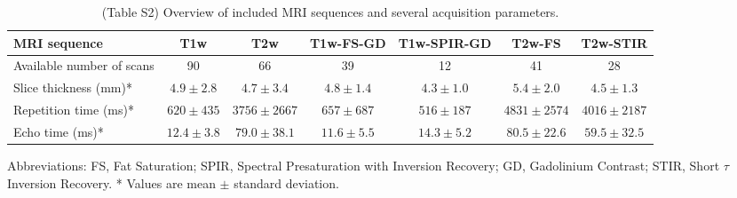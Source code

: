 \begin{table}[htbp]
	\caption{(Table S2) Overview of included MRI sequences and several acquisition parameters.}
	\label{tab:ch2_S2}
	\footnotesize
	\setlength{\tabcolsep}{2pt}
	\begin{tabular}{@{}lcccccc@{}}
		\toprule
		\textbf{MRI sequence} & \textbf{T1w} & \textbf{T2w} & \textbf{T1w-FS-GD} & \textbf{T1w-SPIR-GD} & \textbf{T2w-FS} & \textbf{T2w-STIR} \\
		\midrule
		Available number of scans & 90 & 66 & 39 & 12 & 41 & 28 \\
		Slice thickness (mm)* & $4.9 \pm 2.8$ & $4.7 \pm 3.4$ & $4.8 \pm 1.4$ & $4.3 \pm 1.0$ & $5.4 \pm 2.0$ & $4.5 \pm 1.3$ \\
		Repetition time (ms)* & $620 \pm 435$ & $3756 \pm 2667$ & $657 \pm 687$ & $516 \pm 187$ & $4831 \pm 2574$ & $4016 \pm 2187$ \\
		Echo time (ms)* & $12.4 \pm 3.8$ & $79.0 \pm 38.1$ & $11.6 \pm 5.5$ & $14.3 \pm 5.2$ & $80.5 \pm 22.6$ & $59.5 \pm 32.5$ \\
		\bottomrule
	\end{tabular}

	\vspace{2mm}
	\parbox{\textwidth}{\footnotesize Abbreviations: FS, Fat Saturation; SPIR, Spectral Presaturation with Inversion Recovery; GD, Gadolinium Contrast; STIR, Short $\tau$ Inversion Recovery. * Values are mean $\pm$ standard deviation.}
\end{table}

